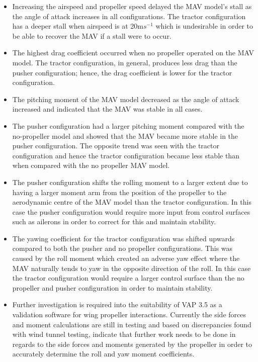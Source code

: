 \begin{itemize}

    \item Increasing the airspeed and propeller speed delayed the MAV model's stall as the angle of attack increases in all configurations. The tractor configuration has a deeper stall when airspeed is at 20m$s^{-1}$ which is undesirable in order to be able to recover the MAV if a stall were to occur. 

    \item  The highest drag coefficient occurred when no propeller operated on the MAV model. The tractor configuration, in general, produces less drag than the pusher configuration; hence, the drag coefficient is lower for the tractor configuration.  

    \item The pitching moment of the MAV model decreased as the angle of attack increased and indicated that the MAV was stable in all cases. 
    
    \item The pusher configuration had a larger pitching moment compared with the no-propeller model and showed that the MAV became more stable in the pusher configuration. The opposite trend was seen with the tractor configuration and hence the tractor configuration became less stable than when compared with the no propeller MAV model.

    \item The pusher configuration shifts the rolling moment to a larger extent due to having a larger moment arm from the position of the propeller to the aerodynamic centre of the MAV model than the tractor configuration. In this case the pusher configuration would require more input from control surfaces such as ailerons in order to correct for this and maintain stability.

    \item  The yawing coefficient for the tractor configuration was shifted upwards compared to both the pusher and no propeller configurations. This was caused by the roll moment which created an adverse yaw effect where the MAV naturally tends to yaw in the opposite direction of the roll. In this case the tractor configuration would require a larger control surface than the no propeller and pusher configuration in order to maintain stability. 
    
    \item Further investigation is required into the suitability of VAP 3.5 as a validation software for wing propeller interactions. Currently the side forces and moment calculations are still in testing and based on discrepancies found with wind tunnel testing, indicate that further work needs to be done in regards to the side forces and moments generated by the propeller in order to accurately determine the roll and yaw moment coefficients. 
    
\end{itemize}



